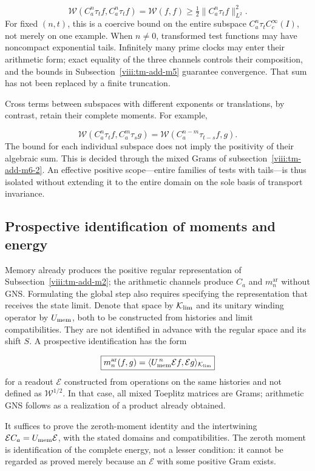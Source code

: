 \[
\boxed{\mathscr W(C_a^n\tau_t f,C_a^n\tau_t f)
=\mathscr W(f,f)
\geq\tfrac12\|C_a^n\tau_t f\|_{L^2}^2.}
\]
For fixed \((n,t)\), this is a coercive bound on the entire subspace \(C_a^n\tau_t C_c^\infty(I)\), not merely on one example. When \(n\ne0\), transformed test functions may have noncompact exponential tails. Infinitely many prime clocks may enter their arithmetic form; exact equality of the three channels controls their composition, and the bounds in Subsection~\ref{viii:tm-add-m5} guarantee convergence. That sum has not been replaced by a finite truncation.

Cross terms between subspaces with different exponents or translations, by contrast, retain their complete moments. For example,

\[
\mathscr W(C_a^n\tau_t f,C_a^m\tau_s g)
=\mathscr W(C_a^{n-m}\tau_{t-s}f,g).
\]
The bound for each individual subspace does not imply the positivity of their algebraic sum. This is decided through the mixed Grams of subsection~\ref{viii:tm-add-m6-2}. An effective positive scope—entire families of tests with tails—is thus isolated without extending it to the entire domain on the sole basis of transport invariance.


\subsection{Prospective identification of moments and energy}
\label{viii:tm-add-m7}
Memory already produces the positive regular representation of
Subsection~\ref{viii:tm-add-m2}; the arithmetic channels produce \(C_a\)
and \(m_n^{\mathrm{ar}}\) without GNS. Formulating the global step also requires
specifying the representation that receives the state limit.
Denote that space by \(\mathcal K_{\rm lim}\) and its unitary winding
operator by \(U_{\rm mem}\), both to be constructed
from histories and limit compatibilities. They are not
identified in advance with the regular space and its shift \(S\).
A prospective identification has the form

\[
\boxed{m_n^{\mathrm{ar}}(f,g)
=\langle U_{\rm mem}^{\,n}\mathcal E f,\mathcal E g\rangle_{\mathcal K_{\rm lim}}}
\]
for a readout \(\mathcal E\) constructed from operations on the same histories and not defined as \(\mathscr W^{1/2}\). In that case, all mixed Toeplitz matrices are Grams; arithmetic GNS follows as a realization of a product already obtained.

It suffices to prove the zeroth-moment identity and the intertwining
\(\mathcal E C_a=U_{\rm mem}\mathcal E\), with the stated domains and
compatibilities. The zeroth moment is identification of the
complete energy, not a lesser condition: it cannot be regarded as proved
merely because an \(\mathcal E\) with some positive Gram exists.

